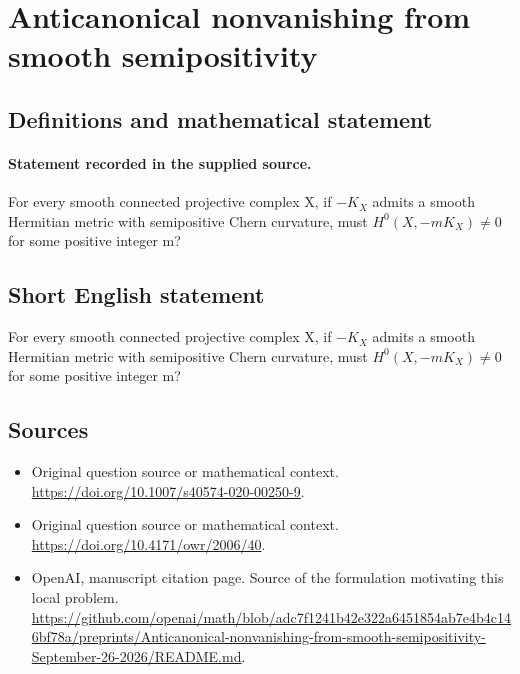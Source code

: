 \documentclass[11pt]{article}
\begin{document}
\section*{Anticanonical nonvanishing from smooth semipositivity}\label{statement}
\subsection{Definitions and mathematical statement}
\paragraph{Statement recorded in the supplied source.}
For every smooth connected projective complex X, if $-K_X$ admits a smooth Hermitian metric with semipositive Chern curvature, must $H^{0}(X,-mK_X)\neq 0$ for some positive integer m?
\subsection{Short English statement}
For every smooth connected projective complex X, if $-K_X$ admits a smooth Hermitian metric with semipositive Chern curvature, must $H^{0}(X,-mK_X)\neq 0$ for some positive integer m?
\subsection{Sources}
\begin{itemize}
\item[S1] Original question source or mathematical context.
\url{https://doi.org/10.1007/s40574-020-00250-9}.
\item[S2] Original question source or mathematical context.
\url{https://doi.org/10.4171/owr/2006/40}.
\item[S3] OpenAI, manuscript citation page. Source of the formulation motivating this local problem.
\url{https://github.com/openai/math/blob/adc7f1241b42e322a6451854ab7e4b4c146bf78a/preprints/Anticanonical-nonvanishing-from-smooth-semipositivity-September-26-2026/README.md}.
\end{itemize}
\end{document}
